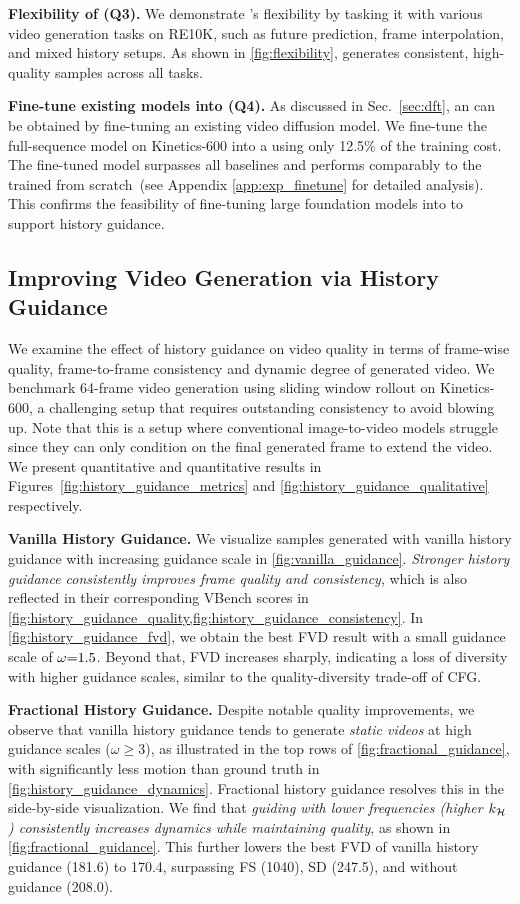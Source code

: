 \textbf{Flexibility of \mtd (Q3).} 
We demonstrate \mtd's flexibility by tasking it with various video generation tasks on RE10K, such as future prediction, frame interpolation, and mixed history setups. As shown in \cref{fig:flexibility}, \mtd generates consistent, high-quality samples across all tasks.


\textbf{Fine-tune existing models into \mtd (Q4).} 
As discussed in Sec.~\ref{sec:dft}, an \mtd can be obtained by fine-tuning an existing video diffusion model. We fine-tune the full-sequence model on Kinetics-600 into a \mtd using only 12.5\% of the training cost. The fine-tuned model surpasses all baselines and performs comparably to the \mtd trained from scratch~(see Appendix \ref{app:exp_finetune} for detailed analysis). This confirms the feasibility of fine-tuning large foundation models into \mtd to support history guidance.

\subsection{Improving Video Generation via History Guidance}
\label{sec:exp_history_guidance}
We examine the effect of history guidance on video quality in terms of frame-wise quality, frame-to-frame consistency and dynamic degree of generated video. We benchmark 64-frame video generation using sliding window rollout on Kinetics-600, a challenging setup that requires outstanding consistency to avoid blowing up. Note that this is a setup where conventional image-to-video models struggle since they can only condition on the final generated frame to extend the video. We present quantitative and quantitative results in Figures~\ref{fig:history_guidance_metrics} and  \cref{fig:history_guidance_qualitative} respectively.

\textbf{Vanilla History Guidance.} We visualize samples generated with vanilla history guidance with increasing guidance scale in \cref{fig:vanilla_guidance}. \emph{Stronger history guidance consistently improves frame quality and consistency}, which is also reflected in their corresponding VBench scores in \cref{fig:history_guidance_quality,fig:history_guidance_consistency}. In \cref{fig:history_guidance_fvd}, we obtain the best FVD result with a small guidance scale of $\omega \mkern-5mu = \mkern-5mu 1.5$. Beyond that, FVD increases sharply, indicating a loss of diversity with higher guidance scales, similar to the quality-diversity trade-off of CFG.

\textbf{Fractional History Guidance.} Despite notable quality improvements, we observe that vanilla history guidance tends to generate \emph{static videos} at high guidance scales ($\omega \geq 3$), as illustrated in the top rows of \cref{fig:fractional_guidance}, with significantly less motion than ground truth in \cref{fig:history_guidance_dynamics}. Fractional history guidance resolves this in the side-by-side visualization. We find that \emph{guiding with lower frequencies (higher $k_{\mathcal{H}}$) consistently increases dynamics while maintaining quality}, as shown in \cref{fig:fractional_guidance}. This further lowers the best FVD of vanilla history guidance (181.6) to 170.4, surpassing FS (1040), SD (247.5), and \mtd without guidance (208.0).

